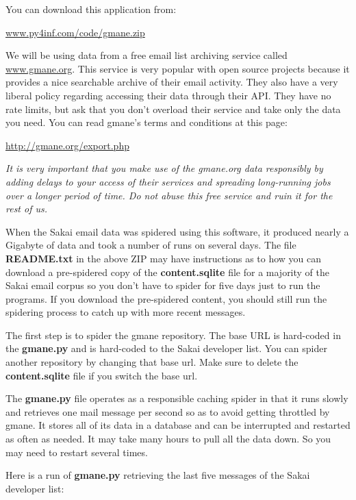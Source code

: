 You can download this application from:

\url{www.py4inf.com/code/gmane.zip}

We will be using data from a free email list archiving service called 
\url{www.gmane.org}.  This service is very popular with open source
projects because it provides a nice searchable archive of their 
email activity.  They also have a very liberal policy regarding accessing 
their data through their API.  They have no rate limits, but ask that you 
don't overload their service and take only the data you need.  You can read
gmane's terms and conditions at this page:

\url{http://gmane.org/export.php}

{\em It is very important that you make use of the gmane.org data
responsibly by adding delays to your access of their services and spreading
long-running jobs over a longer period of time.  Do not abuse this free service
and ruin it for the rest of us.}

When the Sakai email data was spidered using this software, it produced nearly 
a Gigabyte of data and took a number of runs on several days.
The file {\bf README.txt} in the above ZIP may have instructions as to how
you can download a pre-spidered copy of the {\bf content.sqlite} file for 
a majority of the Sakai email corpus so you don't have to spider for 
five days just to run the programs.  If you download the pre-spidered
content, you should still run the spidering process to catch up with 
more recent messages.

The first step is to spider the gmane repository.  The base URL 
is hard-coded in the {\bf gmane.py} and is hard-coded to the Sakai
developer list.  You can spider another repository by changing that
base url.   Make sure to delete the {\bf content.sqlite} file if you 
switch the base url.  

The {\bf gmane.py} file operates as a responsible caching spider in 
that it runs slowly and retrieves one mail message per second so 
as to avoid getting throttled by gmane.   It stores all of
its data in a database and can be interrupted and restarted 
as often as needed.   It may take many hours to pull all the data
down.  So you may need to restart several times.

Here is a run of {\bf gmane.py} retrieving the last five messages of the
Sakai developer list:

